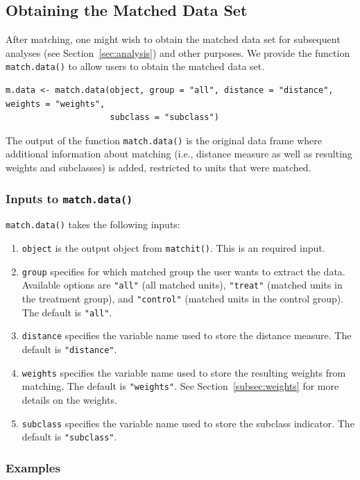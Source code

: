\documentclass[oneside,letterpaper,titlepage]{article}
\begin{document}
\subsection{Obtaining the Matched Data Set}
\label{subsec:match.data}

After matching, one might wish to obtain the matched data set for
subsequent analyses (see Section~\ref{sec:analysis}) and other
purposes. We provide the function {\tt match.data()} to allow users
to obtain the matched data set.
\begin{verbatim}
m.data <- match.data(object, group = "all", distance = "distance", weights = "weights",
                     subclass = "subclass")
\end{verbatim}
The output of the function {\tt match.data()} is the original data
frame where additional information about matching (i.e., distance
measure as well as resulting weights and subclasses) is added, restricted
to units that were matched.

\subsubsection{Inputs to {\tt match.data()}}

{\tt match.data()} takes the following inputs:
\begin{enumerate}
\item {\tt object} is the output object from {\tt matchit()}. This is
  an required input.
\item {\tt group} specifies for which matched group the user wants to extract the
  data. Available options are {\tt "all"} (all matched
  units), {\tt "treat"} (matched units in the treatment group), and
  {\tt "control"} (matched units in the control group). The default is
  {\tt "all"}.
\item {\tt distance} specifies the variable name used to store the
  distance measure. The default is {\tt "distance"}.
\item {\tt weights} specifies the variable name used to store the
  resulting weights from matching. The default is {\tt "weights"}. See
  Section~\ref{subsec:weights} for more details on the weights.
\item {\tt subclass} specifies the variable name used to store the
  subclass indicator. The default is {\tt "subclass"}.
\end{enumerate}

\subsubsection{Examples}
\end{document}
